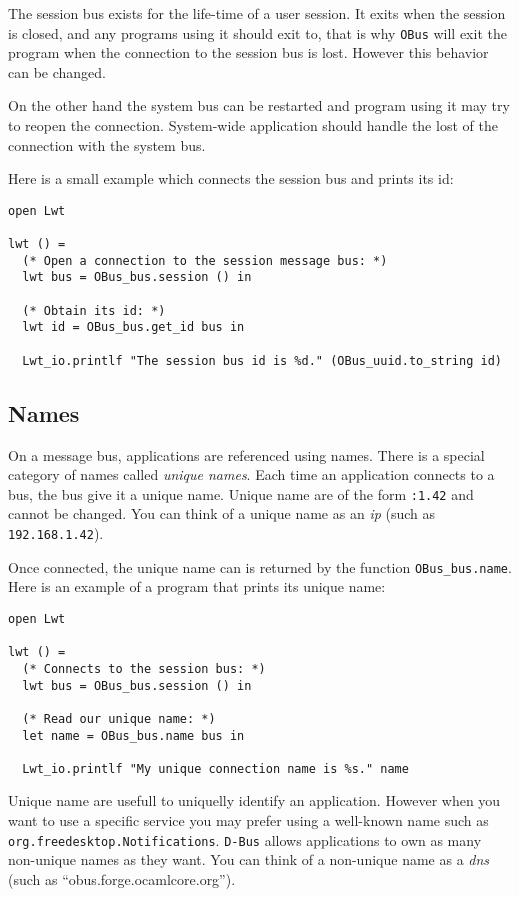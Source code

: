 \documentclass{article}
\newcommand{\obus}{\texttt{OBus}\xspace}
\newcommand{\dbus}{\texttt{D-Bus}\xspace}
\begin{document}
The session bus exists for the life-time of a user session. It exits
when the session is closed, and any programs using it should exit to,
that is why \obus will exit the program when the connection to the
session bus is lost. However this behavior can be changed.

On the other hand the system bus can be restarted and program using it
may try to reopen the connection. System-wide application should
handle the lost of the connection with the system bus.

Here is a small example which connects the session bus and prints its
id:

\lstset{language=[Objective]Caml}
\begin{lstlisting}
open Lwt

lwt () =
  (* Open a connection to the session message bus: *)
  lwt bus = OBus_bus.session () in

  (* Obtain its id: *)
  lwt id = OBus_bus.get_id bus in

  Lwt_io.printlf "The session bus id is %d." (OBus_uuid.to_string id)
\end{lstlisting}

\subsection{Names}

On a message bus, applications are referenced using names. There is a
special category of names called \emph{unique names}. Each time an
application connects to a bus, the bus give it a unique name. Unique
name are of the form \texttt{:1.42} and cannot be changed. You can
think of a unique name as an \emph{ip} (such as
\texttt{192.168.1.42}).

Once connected, the unique name can is returned by the function
\texttt{OBus\_bus.name}.  Here is an example of a program that prints
its unique name:

\lstset{language=[Objective]Caml}
\begin{lstlisting}
open Lwt

lwt () =
  (* Connects to the session bus: *)
  lwt bus = OBus_bus.session () in

  (* Read our unique name: *)
  let name = OBus_bus.name bus in

  Lwt_io.printlf "My unique connection name is %s." name
\end{lstlisting}

Unique name are usefull to uniquelly identify an application. However
when you want to use a specific service you may prefer using a
well-known name such as \texttt{org.freedesktop.Notifications}. \dbus
allows applications to own as many non-unique names as they want. You
can think of a non-unique name as a \emph{dns} (such as
``obus.forge.ocamlcore.org'').
\end{document}
